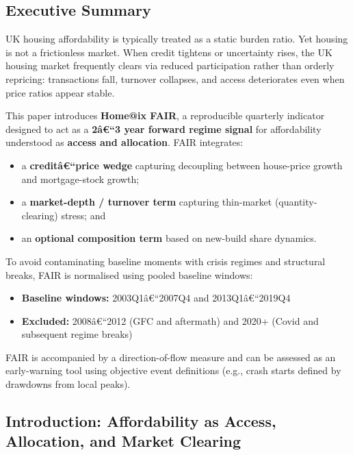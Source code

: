 \subsection{Executive Summary}\label{executive-summary-1}

UK housing affordability is typically treated as a static burden ratio.
Yet housing is not a frictionless market. When credit tightens or
uncertainty rises, the UK housing market frequently clears via reduced
participation rather than orderly repricing: transactions fall, turnover
collapses, and access deteriorates even when price ratios appear stable.

This paper introduces \textbf{Home@ix FAIR}, a reproducible quarterly
indicator designed to act as a \textbf{2â€``3 year forward regime
signal} for affordability understood as \textbf{access and allocation}.
FAIR integrates:

\begin{itemize}
\tightlist
\item
  a \textbf{creditâ€``price wedge} capturing decoupling between
  house-price growth and mortgage-stock growth;
\item
  a \textbf{market-depth / turnover term} capturing thin-market
  (quantity-clearing) stress; and
\item
  an \textbf{optional composition term} based on new-build share
  dynamics.
\end{itemize}

To avoid contaminating baseline moments with crisis regimes and
structural breaks, FAIR is normalised using pooled baseline windows:

\begin{itemize}
\tightlist
\item
  \textbf{Baseline windows:} 2003Q1â€``2007Q4 and 2013Q1â€``2019Q4
\item
  \textbf{Excluded:} 2008â€``2012 (GFC and aftermath) and 2020+ (Covid
  and subsequent regime breaks)
\end{itemize}

FAIR is accompanied by a direction-of-flow measure and can be assessed
as an early-warning tool using objective event definitions (e.g., crash
starts defined by drawdowns from local peaks).

\subsection{Introduction: Affordability as Access, Allocation, and
Market
Clearing}\label{introduction-affordability-as-access-allocation-and-market-clearing}


